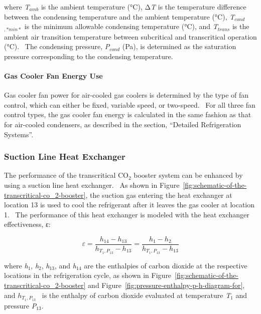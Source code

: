 where \emph{T\(_{amb}\)} is the ambient temperature (°C), Δ\emph{T} is the temperature difference between the condensing temperature and the ambient temperature (°C), \emph{T\(_{cond}\)}\(_{,*min*}\) is the minimum allowable condensing temperature (°C), and \emph{T\(_{trans}\)} is the ambient air transition temperature between subcritical and transcritical operation (°C).~ The condensing pressure, \emph{P\(_{cond}\)} (Pa), is determined as the saturation pressure corresponding to the condensing temperature.

\paragraph{Gas Cooler Fan Energy Use}\label{gas-cooler-fan-energy-use}

Gas cooler fan power for air-cooled gas coolers is determined by the type of fan control, which can either be fixed, variable speed, or two-speed.~ For all three fan control types, the gas cooler fan energy is calculated in the same fashion as that for air-cooled condensers, as described in the section, ``Detailed Refrigeration Systems''.

\subsubsection{Suction Line Heat Exchanger}\label{suction-line-heat-exchanger}

The performance of the transcritical CO\(_{2}\) booster system can be enhanced by using a suction line heat exchanger.~ As shown in Figure~\ref{fig:schematic-of-the-transcritical-co_2-booster}, the suction gas entering the heat exchanger at location 13 is used to cool the refrigerant after it leaves the gas cooler at location 1.~ The performance of this heat exchanger is modeled with the heat exchanger effectiveness, ε:

\begin{equation}
\varepsilon  = \frac{{{h_{14}} - {h_{13}}}}{{{h_{{T_1},{P_{13}}}} - {h_{13}}}} = \frac{{{h_1} - {h_2}}}{{{h_{{T_1},{P_{13}}}} - {h_{13}}}}
\end{equation}

where \emph{h}\(_{1}\), \emph{h}\(_{2}\), \emph{h}\(_{13}\), and \emph{h}\(_{14}\) are the enthalpies of carbon dioxide at the respective locations in the refrigeration cycle, as shown in Figure~\ref{fig:schematic-of-the-transcritical-co_2-booster} and Figure~\ref{fig:pressure-enthalpy-p-h-diagram-for}, and \({h_{{T_1},{P_{13}}}}\) ~is the enthalpy of carbon dioxide evaluated at temperature \emph{T}\(_{1}\) and pressure \emph{P}\(_{13}\).

